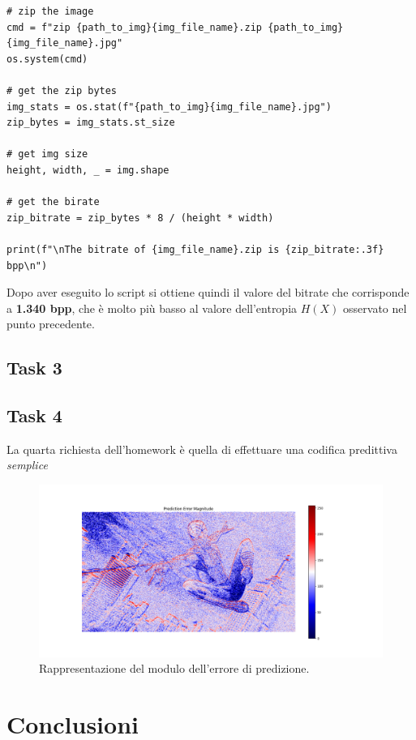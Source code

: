 \begin{lstlisting}
# zip the image
cmd = f"zip {path_to_img}{img_file_name}.zip {path_to_img}{img_file_name}.jpg"
os.system(cmd)

# get the zip bytes
img_stats = os.stat(f"{path_to_img}{img_file_name}.jpg")
zip_bytes = img_stats.st_size

# get img size
height, width, _ = img.shape

# get the birate
zip_bitrate = zip_bytes * 8 / (height * width) 

print(f"\nThe bitrate of {img_file_name}.zip is {zip_bitrate:.3f} bpp\n")
\end{lstlisting}

\noindent Dopo aver eseguito lo script si ottiene quindi il valore del bitrate che corrisponde a \textbf{1.340 bpp}, che è molto più basso al valore dell'entropia $H(X)$ osservato nel punto precedente.





\subsection*{Task 3}

\subsection*{Task 4}
La quarta richiesta dell'homework è quella di effettuare una codifica predittiva \textsl{semplice}




\begin{figure}[h]
    \centering
    \includegraphics[width = .9\textwidth]{hw-1/report/imgs/prediction-error-magnitude.png}
    \caption{Rappresentazione del modulo dell'errore di predizione.}
    \label{fig:error-prediction-magnitude}
\end{figure}


\section{Conclusioni}


